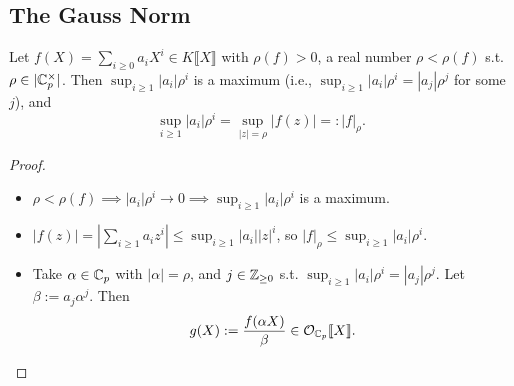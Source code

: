 \subsection{The Gauss Norm}
\begin{theorem}
    Let $f(X) = \sum_{i\ge 0} a_iX^i\in K\llbracket X\rrbracket $ with $\rho(f) > 0$, a real number $\rho < \rho(f)$ s.t. $\rho\in |\mathbb{C}_p^\times|$.
    Then $\sup_{i\ge 1}{|a_i|\rho^i}$ is a maximum (i.e., $\sup_{i\ge 1}{|a_i|\rho^i} = |a_j|\rho^j$ for some $j$), and \[\sup_{i\ge 1}{|a_i|\rho^i} = \sup_{|z| = \rho} |f(z)| =: |f|_\rho.\]
\end{theorem}
\begin{proof}
\begin{itemize}
    \item     $\rho<\rho(f)\implies |a_i|\rho^i \to 0\implies \sup_{i\ge 1}{|a_i|\rho^i}$ is a maximum.
    \item $|f(z)| = \left| \sum_{i\ge 1} a_iz^i\right| \le\sup_{i\ge 1} |a_i||z|^i$, so $|f|_\rho\le \sup_{i\ge 1}{|a_i|\rho^i}$.
    \item Take $\alpha\in\mathbb{C}_p$ with $|\alpha| = \rho$,
    and $j\in\mathbb{Z}_{\ge 0}$ s.t. $\sup_{i\ge 1}{|a_i|\rho^i} = |a_j|\rho^j$.
    Let $\beta := a_j\alpha^j$.
    Then \[g(X) := \frac{f(\alpha X)}{\beta}\in\mathcal{O}_{\mathbb{C}_p}\llbracket X\rrbracket.\]
\end{itemize}\end{proof}




